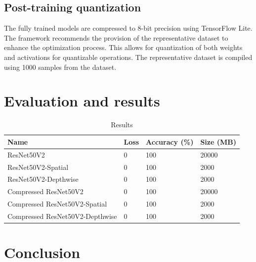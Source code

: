 \documentclass{article}
\begin{document}
	\subsection{Post-training quantization}
	The fully trained models are compressed to 8-bit precision using TensorFlow Lite. The framework recommends the provision of the representative dataset to enhance the optimization process. This allows for quantization of both weights and activations for quantizable operations. The representative dataset is compiled using 1000 samples from the dataset. 	
	
	
	\section{Evaluation and results}
	
	\begin{table}
		\caption{Results}
		\label{tbl:results}
		\centering
		\begin{tabular}{llll}
			\toprule
			Name                            & Loss & Accuracy (\%) & Size (MB) \\ \midrule
			ResNet50V2                      & 0    & 100           & 20000     \\
			ResNet50V2-Spatial              & 0    & 100           & 2000      \\
			ResNet50V2-Depthwise            & 0    & 100           & 2000      \\
			Compressed ResNet50V2           & 0    & 100           & 20000     \\
			Compressed ResNet50V2-Spatial   & 0    & 100           & 2000      \\
			Compressed ResNet50V2-Depthwise & 0    & 100           & 2000      \\ \bottomrule
		\end{tabular}
	\end{table}
	
	
	\section{Conclusion}
	
	
	
%	

	
\end{document}
